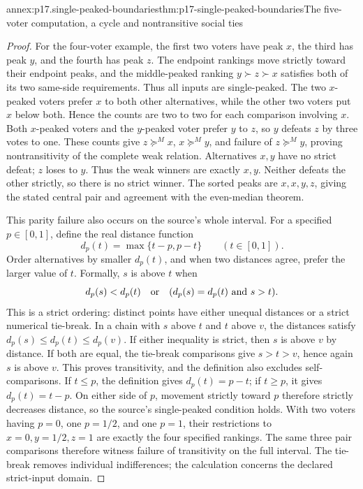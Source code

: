 \begin{annexitem}{annex:p17.single-peaked-boundaries}{thm:p17-single-peaked-boundaries}{The five-voter computation, a cycle and nontransitive social ties}
\begin{proof}
For the four-voter example, the first two voters have peak \(x\),
the third has peak \(y\), and the fourth has peak \(z\).
The endpoint rankings move strictly toward their endpoint peaks, and
the middle-peaked ranking \(y\succ z\succ x\) satisfies both
of its two same-side requirements. Thus all inputs are single-peaked.
The two \(x\)-peaked voters prefer \(x\) to both other alternatives,
while the other two voters put \(x\) below both. Hence the counts
are two to two for each comparison involving \(x\). Both
\(x\)-peaked voters and the \(y\)-peaked voter prefer \(y\)
to \(z\), so \(y\) defeats \(z\) by three votes to one.
These counts give \(z\succeq^M x\), \(x\succeq^M y\),
and failure of \(z\succeq^M y\), proving nontransitivity of
the complete weak relation. Alternatives \(x,y\) have no strict
defeat; \(z\) loses to \(y\). Thus the weak winners are exactly
\(x,y\). Neither defeats the other strictly, so there is no strict
winner. The sorted peaks are \(x,x,y,z\), giving the stated
central pair and agreement with the even-median theorem.

This parity failure also occurs on the source's whole interval.
For a specified \(p\in[0,1]\), define the real distance function
\[
 d_p(t)=\max\{t-p,p-t\}\qquad(t\in[0,1]).
\]
Order alternatives by smaller \(d_p(t)\), and when two distances agree,
prefer the larger value of \(t\). Formally, \(s\) is above \(t\) when
\[
 d_p(s)<d_p(t)\quad\hbox{or}\quad
       (d_p(s)=d_p(t)\ \hbox{and}\ s>t).
\]
This is a strict ordering: distinct points have either unequal distances
or a strict numerical tie-break. In a chain with \(s\) above \(t\)
and \(t\) above \(v\), the distances satisfy
\(d_p(s)\leq d_p(t)\leq d_p(v)\). If either inequality is strict,
then \(s\) is above \(v\) by distance. If both are equal, the
tie-break comparisons give \(s>t>v\), hence again \(s\) is above
\(v\). This proves transitivity, and the definition also excludes
self-comparisons. If \(t\leq p\), the definition gives \(d_p(t)=p-t\);
if \(t\geq p\), it gives \(d_p(t)=t-p\). On either side of \(p\),
movement strictly toward \(p\) therefore strictly decreases distance, so the source's
single-peaked condition holds. With two voters having \(p=0\),
one \(p=1/2\), and one \(p=1\), their restrictions to
\(x=0,y=1/2,z=1\) are exactly the four specified rankings.
The same three pair comparisons therefore witness failure of
transitivity on the full interval. The tie-break removes individual
indifferences; the calculation concerns the declared strict-input domain.
\end{proof}
\end{annexitem}

